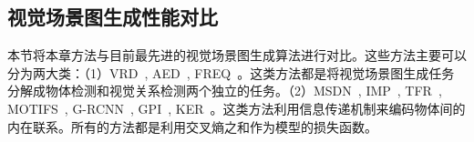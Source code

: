 \begin{table}
\begin{center}
\end{center}
\caption{xx}
\label{xx}
\end{table}



\subsection{视觉场景图生成性能对比}
本节将本章方法与目前最先进的视觉场景图生成算法进行对比。这些方法主要可以分为两大类：（1）VRD~\cite{lu2016visual}, AED~\cite{newell2017pixels}, FREQ~\cite{zellers2018neural}。这类方法都是将视觉场景图生成任务分解成物体检测和视觉关系检测两个独立的任务。（2）MSDN~\cite{li2017scene}, IMP~\cite{xu2017scene}, TFR~\cite{jae2018tensorize}, MOTIFS~\cite{zellers2018neural}, G-RCNN~\cite{yang2018graph}, GPI~\cite{herzig2018mapping}, KER~\cite{chen2019knowledge}。这类方法利用信息传递机制来编码物体间的内在联系。所有的方法都是利用交叉熵之和作为模型的损失函数。


